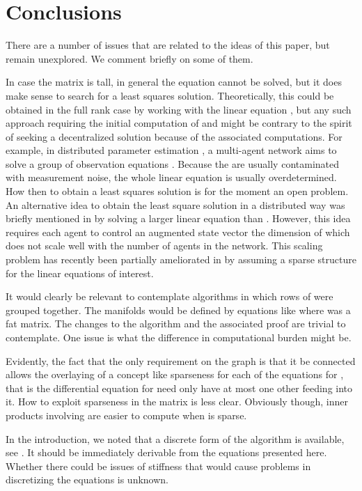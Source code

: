 \documentclass{aims}
\begin{document}
\section{Conclusions}

There are a number of issues that are related to the ideas of this paper, but remain unexplored. We comment briefly on some of them.

In case the matrix  is tall, in general the equation  cannot be solved, but it does make sense to search for a least squares solution. Theoretically, this could be obtained in the full rank case by working with the linear equation , but any such approach requiring the initial computation of  and  might be contrary to the spirit of seeking a decentralized solution because of  the associated computations.  For example, in distributed parameter estimation \cite{SJK12IT}, a multi-agent network aims to solve a group of observation equations . Because the  are usually contaminated with measurement noise, the whole linear equation  is usually overdetermined.  How then to obtain a least squares solution is for the moment an open problem. An alternative idea to obtain the least square solution in a distributed way was briefly mentioned in \cite{SJA14TAC} by solving a larger linear equation than . However, this idea requires each agent to control an augmented state vector the dimension of which does not scale well with the number of agents in the network. This scaling problem has recently been partially ameliorated in \cite{SAZLD15SCL} by assuming a sparse structure for the linear equations of interest.

It would clearly be relevant to contemplate algorithms in which rows of  were grouped together. The manifolds  would be defined by equations like  where  was a fat matrix. The changes to the algorithm and the associated proof are trivial to contemplate. One issue is what the difference in computational burden might be.

Evidently, the fact that the only requirement on the graph is that it be connected allows the overlaying of a concept like sparseness for each of the equations for , that is the differential equation for  need only have at most one other  feeding into it.  How to exploit sparseness in the matrix  is less clear. Obviously though, inner products involving  are easier to compute when  is sparse.

In the introduction, we noted that a discrete form of the algorithm is available, see \cite{SA13ECC,SJA13Allerton,SJA14TAC}. It should be immediately derivable from the equations presented here. Whether there could be issues of stiffness that would cause problems in discretizing the equations is unknown.
\end{document}
